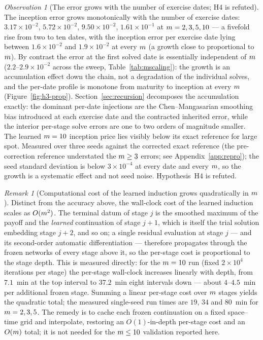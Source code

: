 \documentclass[11pt]{article}
\theoremstyle{plain}
\theoremstyle{definition}
\theoremstyle{remark}
\newtheorem{observation}[theorem]{Observation}
\newtheorem{remark}[theorem]{Remark}
\begin{document}
\begin{observation}[The error grows with the number of exercise dates; H4 is refuted]\label{obs:h4}
The inception error grows monotonically with the number of exercise dates:
$3.17\times10^{-2}$, $5.72\times10^{-2}$, $9.50\times10^{-2}$, $1.61\times10^{-1}$
at $m=2,3,5,10$ --- a fivefold rise from two to ten dates, with the
inception error per exercise date lying between $1.6\times10^{-2}$ and
$1.9\times10^{-2}$ at every $m$ (a growth close to proportional to
$m$). By contrast the error at the first solved date is essentially
independent of $m$ ($2.2$--$2.9\times10^{-2}$ across the sweep,
Table~\ref{tab:mscaling}): the growth is an accumulation effect down the chain, not
a degradation of the individual solves, and the per-date profile is monotone from
maturity to inception at every $m$ (Figure~\ref{fig:h3-prop}).
Section~\ref{sec:recursion} decomposes the accumulation exactly: the dominant
per-date injections are the Chen--Mangasarian smoothing bias introduced at each
exercise date and the contracted inherited error, while the interior per-stage
solve errors are one to two orders of magnitude smaller. The learned
$m=10$ inception price lies visibly below its exact reference for
large spot. Measured over three seeds against the corrected exact reference (the
pre-correction reference understated the $m\ge3$ errors; see
Appendix~\ref{app:repro}); the seed standard deviation is below $3\times10^{-4}$ at
every date and every $m$, so the growth is a systematic effect and
not seed noise. Hypothesis~H4 is refuted.
\end{observation}

\begin{remark}[Computational cost of the learned induction grows quadratically in $m$]\label{rem:cost}
Distinct from the accuracy above, the wall-clock cost of the learned induction
scales as $O(m^{2})$. The terminal datum of stage $j$ is the
smoothed maximum of the payoff and the \emph{learned} continuation of stage
$j{+}1$, which is itself the trial solution embedding stage $j{+}2$, and so on;
a single residual evaluation at stage $j$ --- and its second-order automatic
differentiation --- therefore propagates through the frozen networks of every stage
above it, so the per-stage cost is proportional to the stage depth. This is measured
directly: for the $m=10$ run (fixed $2\times10^{4}$ iterations per
stage) the per-stage wall-clock increases linearly with depth, from $7.1$~min at the
top interval to $37.2$~min eight intervals down --- about $4$--$4.5$~min per
additional frozen stage. Summing a linear per-stage cost over $m$
stages yields the quadratic total; the measured single-seed run times are $19$, $34$
and $80$~min for $m=2,3,5$. The remedy is to cache each frozen
continuation on a fixed space--time grid and interpolate, restoring an
$O(1)$-in-depth per-stage cost and an $O(m)$ total; it is not needed
for the $m\le10$ validation reported here.
\end{remark}
\end{document}
